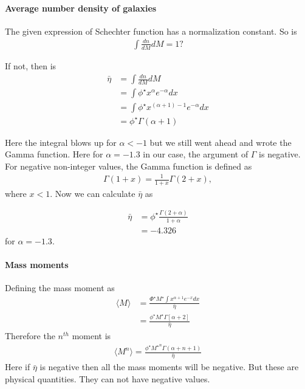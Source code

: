 \documentclass[12pt]{article}
\numberwithin{equation}{section}
\begin{document}
\paragraph{Average number density of galaxies} The given expression of Schechter function has a normalization constant. So is
\begin{align}
\int \frac{dn}{dM}dM = 1?
\end{align}

If not, then is
\begin{align}
\bar{\eta} &= \int \frac{dn}{dM}dM\\
&= \int \phi^\star x^\alpha e^{-\alpha} dx \\
&= \int \phi^\star x^{(\alpha + 1) - 1} e^{-\alpha} dx \\
&= \phi^\star\Gamma(\alpha + 1)
\end{align}

Here the integral blows up for $ \alpha < -1 $ but we still went ahead and wrote the Gamma function. 
Here for $ \alpha = -1.3 $ in our case, the argument of $\Gamma$ is negative. For negative non-integer values, the Gamma function is defined as
\begin{align}
\Gamma(1+x) = \frac{1}{1+x}\Gamma(2 + x),
\end{align}
where $ x < 1$. Now we can calculate $\bar{\eta}$ as

\begin{align}
\bar{\eta}  &= \phi^\star \frac{\Gamma(2 + \alpha)}{1 + \alpha}\\
&= -4.326
\end{align} 
for $ \alpha  = -1.3$.

\paragraph{Mass moments}
Defining the mass moment as
\begin{align}
\langle M \rangle &= \frac{\Phi^\star M^\star \int  x^{\alpha + 1} e^{-x}dx}{\bar{\eta}}\\
&= \frac{\phi^\star M^\star \Gamma[\alpha + 2]}{\bar{\eta}}
\end{align}
Therefore the $ n^{th} $ moment is
\begin{align}
\langle M^n \rangle = \frac{\phi^\star {M^\star}^n \Gamma(\alpha + n + 1)}{\bar{\eta}}
\end{align}
Here if $\bar{\eta}$ is negative then all the mass moments will be negative. But these are physical quantities. They can not have negative values.
\end{document}
